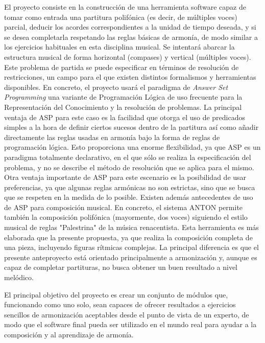  El proyecto consiste en la construcción de una herramienta software capaz de tomar como entrada una partitura polifónica (es decir, de múltiples voces) parcial, deducir los acordes correspondientes a la unidad de tiempo deseada, y si se desea completarla respetando las reglas básicas de armonía, de modo similar a los ejercicios habituales en esta disciplina musical. Se intentará abarcar la estructura musical de forma horizontal (compases) y vertical (múltiples voces). Este problema de partida se puede especificar en términos de resolución de restricciones, un campo para el que existen distintos formalismos y herramientas disponibles. En concreto, el proyecto usará el paradigma de \textit{Answer Set Programming} una variante de Programación Lógica de uso frecuente para la Representación del Conocimiento y la resolución de problemas. La principal ventaja de ASP para este caso es la facilidad que otorga el uso de predicados simples a la hora de definir ciertos sucesos dentro de la partitura así como añadir directamente las reglas usadas en armonía bajo la forma de reglas de programación lógica. Esto proporciona una enorme flexibilidad, ya que ASP es un paradigma totalmente declarativo, en el que sólo se realiza la especificación del problema, y no se describe el método de resolución que se aplica para el mismo. Otra ventaja importante de ASP para este escenario es la posibilidad de usar preferencias, ya que algunas reglas armónicas no son estrictas, sino que se busca que se respeten en la medida de lo posible. Existen además antecedentes de uso de ASP para composición musical. En concreto, el sistema ANTON permite también la composición polifónica (mayormente, dos voces) siguiendo el estilo musical de reglas "Palestrina" de la música renacentista. Esta herramienta es más elaborada que la presente propuesta, ya que realiza la composición completa de una pieza, incluyendo figuras rítmicas complejas. La principal diferencia es que el presente anteproyecto está orientado principalmente a armonización y, aunque es capaz de completar partituras, no busca obtener un buen resultado a nivel melódico.
 
 El principal objetivo del proyecto es crear un conjunto de módulos que, funcionando como uno solo, sean capaces de ofrecer resultados a ejercicios sencillos de armonización aceptables desde el punto de vista de un experto, de modo que el software final pueda ser utilizado en el mundo real para ayudar a la composición y al aprendizaje de armonía.
 
